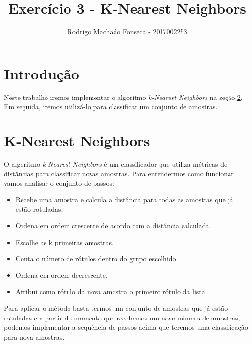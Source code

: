 \documentclass[12pt]{article}
\begin{document}

\pagestyle{fancy}
\fancyhf{}
\renewcommand{\headrulewidth}{0.4pt}
\fancyfoot[C]{\thepage}
\renewcommand{\footrulewidth}{0.4pt}
\fancyfoot[C]{\thepage}
\title{\LARGE \bf
 Exercício 3 -  K-Nearest Neighbors}
\author{ Rodrigo Machado Fonseca - 2017002253}
\thispagestyle{fancy}
\maketitle
\thispagestyle{fancy}

\section{Introdução}

  \par Neste trabalho iremos implementar o algoritmo \textit{k-Nearest Neighbors} na seção \ref{knn}. Em seguida, iremos utilizá-lo para classificar um conjunto de amostras. 
  
\section{K-Nearest Neighbors}
  \label{knn}
  \par O algoritmo \textit{k-Nearest Neighbors} é um classificador que utiliza métricas de distâncias para classificar novas amostras. Para entendermos como funcionar vamos analisar o conjunto de passos:

  \begin{itemize}
    \item Recebe uma amostra e calcula a distância para todas as amostras que já estão rotuladas. 
    \item Ordena em ordem crescente de acordo com a distância calculada.
    \item Escolhe as k primeiras amostras.
    \item Conta o número de rótulos dentro do grupo escolhido.
    \item Ordena em ordem decrescente. 
    \item Atribui como rótulo da nova amostra o primeiro rótulo da lista. 
  \end{itemize}

  \par Para aplicar o método basta termos um conjunto de amostras que já estão rotuladas e a partir do momento que recebemos um novo número de amostras, podemos implementar a sequência de passos acima que teremos uma classificação para nova amostras. 
  
\end{document}
